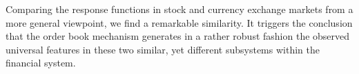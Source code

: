 Comparing the response functions in stock and currency exchange markets from a
more general viewpoint, we find a remarkable similarity. It triggers the
conclusion that the order book mechanism generates in a rather robust fashion
the observed universal features in these two similar, yet different subsystems
within the financial system.
